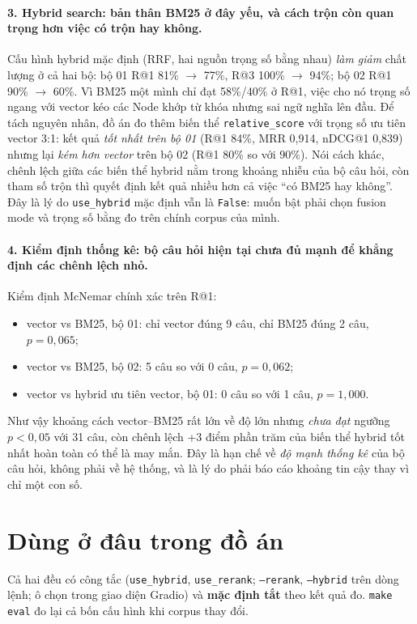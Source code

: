 \paragraph{3. Hybrid search: bản thân BM25 ở đây yếu, và cách trộn còn quan trọng hơn việc có trộn hay không.}
Cấu hình hybrid mặc định (RRF, hai nguồn trọng số bằng nhau) \emph{làm giảm} chất lượng ở cả hai bộ:
bộ 01 R@1 81\% $\to$ 77\%, R@3 100\% $\to$ 94\%; bộ 02 R@1 90\% $\to$ 60\%. Vì BM25 một mình chỉ đạt
58\%/40\% ở R@1, việc cho nó trọng số ngang với vector kéo các Node khớp từ khóa nhưng sai ngữ nghĩa
lên đầu. Để tách nguyên nhân, đồ án đo thêm biến thể \texttt{relative\_score} với trọng số ưu tiên
vector 3:1: kết quả \emph{tốt nhất trên bộ 01} (R@1 84\%, MRR 0,914, nDCG@1 0,839) nhưng lại
\emph{kém hơn vector} trên bộ 02 (R@1 80\% so với 90\%). Nói cách khác, chênh lệch giữa các biến thể
hybrid nằm trong khoảng nhiễu của bộ câu hỏi, còn tham số trộn thì quyết định kết quả nhiều hơn cả
việc ``có BM25 hay không''. Đây là lý do \texttt{use\_hybrid} mặc định vẫn là \texttt{False}: muốn
bật phải chọn fusion mode và trọng số bằng đo trên chính corpus của mình.

\paragraph{4. Kiểm định thống kê: bộ câu hỏi hiện tại chưa đủ mạnh để khẳng định các chênh lệch nhỏ.}
Kiểm định McNemar chính xác trên R@1:
\begin{itemize}
  \item vector vs BM25, bộ 01: chỉ vector đúng 9 câu, chỉ BM25 đúng 2 câu, $p = 0{,}065$;
  \item vector vs BM25, bộ 02: 5 câu so với 0 câu, $p = 0{,}062$;
  \item vector vs hybrid ưu tiên vector, bộ 01: 0 câu so với 1 câu, $p = 1{,}000$.
\end{itemize}
Như vậy khoảng cách vector--BM25 rất lớn về độ lớn nhưng \emph{chưa đạt} ngưỡng $p<0{,}05$ với 31
câu, còn chênh lệch +3 điểm phần trăm của biến thể hybrid tốt nhất hoàn toàn có thể là may mắn. Đây
là hạn chế về \emph{độ mạnh thống kê} của bộ câu hỏi, không phải về hệ thống, và là lý do phải báo
cáo khoảng tin cậy thay vì chỉ một con số.


\section{Dùng ở đâu trong đồ án}

Cả hai đều có công tắc (\texttt{use\_hybrid}, \texttt{use\_rerank}; \texttt{--rerank}, \texttt{--hybrid} trên dòng
lệnh; ô chọn trong giao diện Gradio) và \textbf{mặc định tắt} theo kết quả đo. \texttt{make eval} đo lại cả
bốn cấu hình khi corpus thay đổi.
